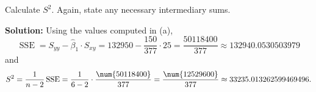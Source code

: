 Calculate $S^2$. Again, state any necessary intermediary sums.

\nl \textbf{Solution: } Using the values computed in (a),
$$\operatorname{SSE} = S_{yy} - \widehat{\beta}_1 \cdot S_{xy} = 132950 - \frac{150}{377} \cdot 25 = \frac{\num{50118400}}{377} \approx 132940.0530503979$$
and
$$S^2 = \over{n-2} \operatorname{SSE} = \over{6-2} \cdot \frac{\num{50118400}}{377} = \frac{\num{12529600}}{377} \approx 33235.013262599469496.$$

